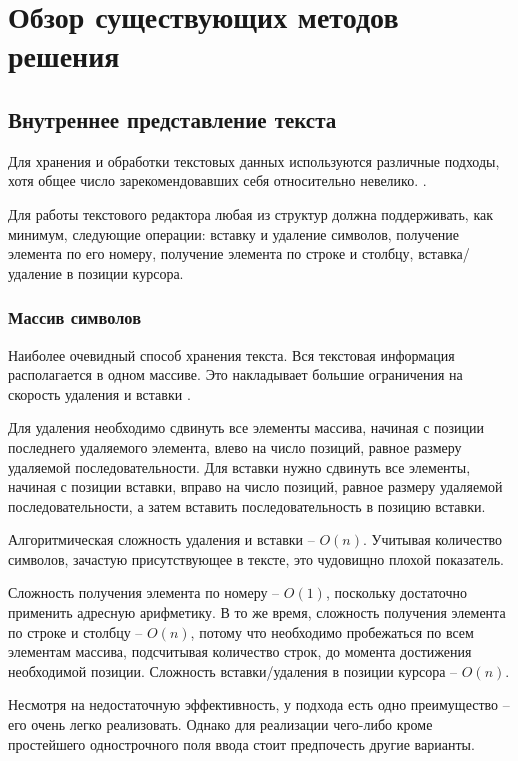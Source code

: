 \documentclass{fefu}
\begin{document}
	\section{Обзор существующих методов решения}
		\subsection{Внутреннее представление текста}
			\par Для хранения и обработки текстовых данных используются различные подходы,
				хотя общее число зарекомендовавших себя относительно невелико.
				\cite{TextEditorDataStructures}.
			\par Для работы текстового редактора любая из структур должна поддерживать, как 
			минимум, следующие операции: вставку и удаление символов, получение элемента по его
			номеру, получение элемента по строке и столбцу, вставка/удаление в позиции курсора.
			\subsubsection{Массив символов}
				\par Наиболее очевидный способ хранения текста. Вся текстовая информация
				располагается в одном массиве. Это накладывает большие ограничения на скорость
				удаления и вставки \cite{StringsReference}. 
				\par Для удаления необходимо сдвинуть все элементы массива, начиная с позиции
				последнего удаляемого элемента, влево на число позиций, равное размеру
				удаляемой последовательности. Для вставки нужно сдвинуть все элементы, начиная
				с позиции вставки, вправо на число позиций, равное размеру удаляемой
				последовательности, а затем вставить последовательность в позицию вставки.
				\par Алгоритмическая сложность удаления и вставки -- $O(n)$. Учитывая 
				количество символов, зачастую присутствующее в тексте, это чудовищно плохой 
				показатель.
				\par Сложность получения элемента по номеру -- $O(1)$, поскольку достаточно
				применить адресную арифметику. В то же время, сложность получения элемента по
				строке и столбцу -- $O(n)$, потому что необходимо пробежаться по всем элементам
				массива, подсчитывая количество строк, до момента достижения необходимой
				позиции. Сложность вставки/удаления в позиции курсора -- $O(n)$.
				\par Несмотря на недостаточную эффективность, у подхода есть одно преимущество
				-- его очень легко реализовать. Однако для реализации чего-либо кроме
				простейшего однострочного поля ввода стоит предпочесть другие варианты.
\end{document}
